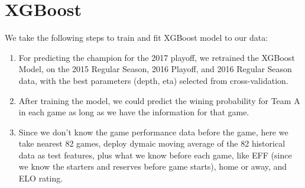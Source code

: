 \section{XGBoost}

We take the following steps to train and fit XGBoost model to our data: 
\begin{enumerate}
	\item For predicting the champion for the 2017 playoff, we retrained the
	    XGBoost Model, on the 2015 Regular Season, 2016 Playoff, and 2016
	    Regular Season data, with the best parameters (depth, eta) selected 
	    from cross-validation. 
	\item After training the model, we could predict the wining probability
	    for Team A in each game as long as we have the information for that game.
	\item Since we don't know the game performance data before the game, here
	    we take nearest 82 games, deploy dymaic moving average of the 82 historical
        data as test features, plus what we know before each game, like EFF (since
        we know the starters and reserves before game starts), home or away, and
        ELO rating.
\end{enumerate}



